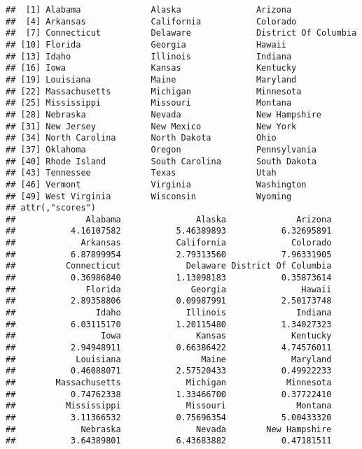 \documentclass[]{article}
\begin{document}
\begin{verbatim}
##  [1] Alabama              Alaska               Arizona             
##  [4] Arkansas             California           Colorado            
##  [7] Connecticut          Delaware             District Of Columbia
## [10] Florida              Georgia              Hawaii              
## [13] Idaho                Illinois             Indiana             
## [16] Iowa                 Kansas               Kentucky            
## [19] Louisiana            Maine                Maryland            
## [22] Massachusetts        Michigan             Minnesota           
## [25] Mississippi          Missouri             Montana             
## [28] Nebraska             Nevada               New Hampshire       
## [31] New Jersey           New Mexico           New York            
## [34] North Carolina       North Dakota         Ohio                
## [37] Oklahoma             Oregon               Pennsylvania        
## [40] Rhode Island         South Carolina       South Dakota        
## [43] Tennessee            Texas                Utah                
## [46] Vermont              Virginia             Washington          
## [49] West Virginia        Wisconsin            Wyoming             
## attr(,"scores")
##              Alabama               Alaska              Arizona 
##           4.16107582           5.46389893           6.32695891 
##             Arkansas           California             Colorado 
##           6.87899954           2.79313560           7.96331905 
##          Connecticut             Delaware District Of Columbia 
##           0.36986840           1.13098183           0.35873614 
##              Florida              Georgia               Hawaii 
##           2.89358806           0.09987991           2.50173748 
##                Idaho             Illinois              Indiana 
##           6.03115170           1.20115480           1.34027323 
##                 Iowa               Kansas             Kentucky 
##           2.94948911           0.66386422           4.74576011 
##            Louisiana                Maine             Maryland 
##           0.46088071           2.57520433           0.49922233 
##        Massachusetts             Michigan            Minnesota 
##           0.74762338           1.33466700           0.37722410 
##          Mississippi             Missouri              Montana 
##           3.11366532           0.75696354           5.00433320 
##             Nebraska               Nevada        New Hampshire 
##           3.64389801           6.43683882           0.47181511 

\end{verbatim}
\end{document}
